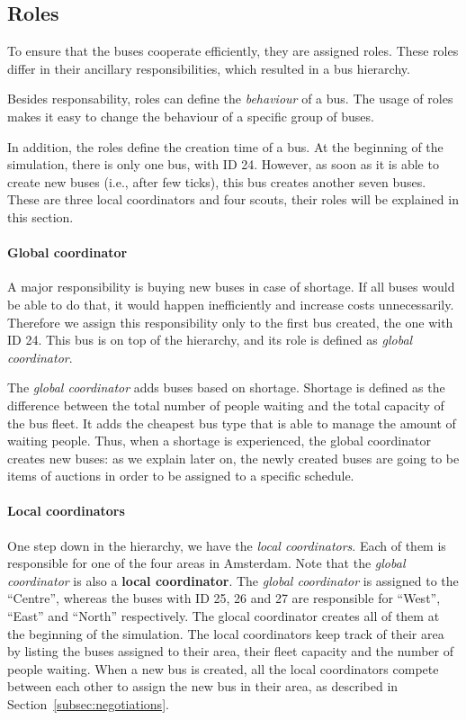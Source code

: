 \subsection{Roles}
\label{subsec:roles}

To ensure that the buses cooperate efficiently, they are assigned roles. These roles differ in their ancillary responsibilities, which resulted in a bus hierarchy.

Besides responsability, roles can define the \textit{behaviour} of a bus. The usage of roles makes it easy to change the behaviour of a specific group of buses.

In addition, the roles define the creation time of a bus. At the beginning of the simulation, there is only one bus, with ID 24. However, as soon as it is able to create new buses (i.e., after few ticks), this bus creates another seven buses. These are three local coordinators and four scouts, their roles will be explained in this section.

\paragraph{Global coordinator}

A major responsibility is buying new buses in case of shortage. If all buses would be able to do that, it would happen inefficiently and increase costs unnecessarily. Therefore we assign this responsibility only to the first bus created, the one with ID 24. This bus is on top of the hierarchy, and its role is defined as \textit{global coordinator}. 

The \textit{global coordinator} adds buses based on shortage. Shortage is defined as the difference between the total number of people waiting and the total capacity of the bus fleet. It adds the cheapest bus type that is able to manage the amount of waiting people. Thus, when a shortage is experienced, the global coordinator creates new buses: as we explain later on, the newly created buses are going to be items of auctions in order to be assigned to a specific schedule.

\paragraph{Local coordinators}

One step down in the hierarchy, we have the \textit{local coordinators}. Each of them is responsible for one of the four areas in Amsterdam. Note that the \textit{global coordinator} is also a \textbf{local coordinator}. The \textit{global coordinator} is assigned to the ``Centre'', whereas the buses with ID 25, 26 and 27 are responsible for ``West'', ``East'' and ``North'' respectively. The glocal coordinator creates all of them at the beginning of the simulation. The local coordinators keep track of their area by listing the buses assigned to their area, their fleet capacity and the number of people waiting. When a new bus is created, all the local coordinators compete between each other to assign the new bus in their area, as described in Section~\ref{subsec:negotiations}.

